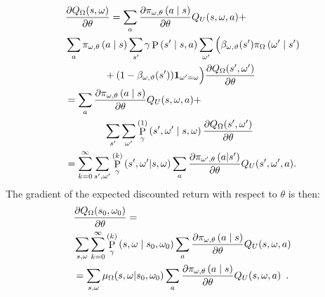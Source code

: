 \documentclass[letterpaper]{article}
\def\given{\;\middle\vert\;}
\def\indicator{\mathbf{1}}
\DeclareMathOperator{\prob}{P}
\begin{document}
\begin{align*}
&\deriv[Q_\Omega(s, \omega)]{\theta} = \sum_a \deriv[\pi_{\omega,\theta}\left( a \given s \right)]{\theta}  Q_U(s,\omega, a) + \\
&\sum_a \pi_{\omega, \theta}\left( a \given s\right) \sum_{s'} \gamma \prob\left(s' \given s, a\right) \sum_{\omega'}\Big(\beta_{\omega, \vartheta}(s') \pi_\Omega\left(\omega' \given s'\right) \notag\\
&\hspace{4em}+ (1 -\beta_{\omega, \vartheta}(s'))\indicator_{\omega'=\omega}  \Big) \deriv[Q_\Omega(s', \omega')]{\theta} \notag \\
&= \sum_a \deriv[\pi_{\omega,\theta}\left( a \given s \right)]{\theta}  Q_U(s,\omega, a) + \notag \\
&\hspace{4em}\sum_{s'} \sum_{\omega'} \prob_\gamma^{(1)}\left( s', \omega' \given s, \omega\right) \deriv[Q_\Omega(s', \omega')]{\theta}\\
&= \sum_{k=0}^\infty \sum_{s',\omega'} \prob_\gamma^{(k)}\left( s', \omega' | s, \omega\right) \sum_a \deriv[\pi_{\omega',\theta}\left( a | s' \right)]{\theta}  Q_U(s',\omega', a)  .
\end{align*}
The gradient of the expected discounted return with respect to $\theta$ is then:
\begin{align*}
&\deriv[Q_\Omega(s_0, \omega_0)]{\theta} = \\
&\sum_{s,\omega} \sum_{k=0}^\infty \prob_\gamma^{(k)}\left( s, \omega \given s_0, \omega_0\right)\sum_a \deriv[\pi_{\omega,\theta}\left( a \given s \right)]{\theta}Q_U(s,\omega, a) \\
&= \sum_{s, \omega} \mu_\Omega(s, \omega | s_0, \omega_0) \sum_a \deriv[\pi_{\omega,\theta}\left( a \given s \right)]{\theta} Q_U(s,\omega, a) \enspace .
\end{align*}
\end{document}
